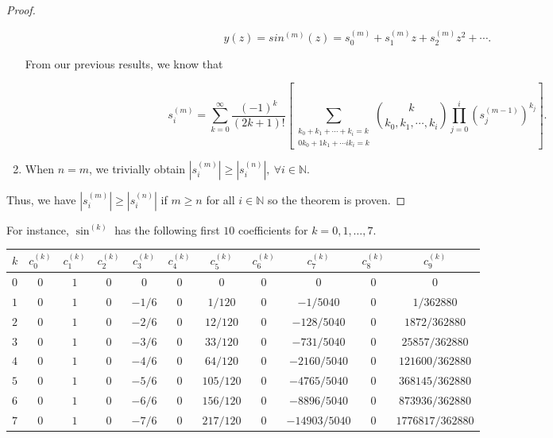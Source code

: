 \documentclass{article}
\begin{document}
\begin{proof}
\begin{enumerate}
            \begin{equation}
                y(z) = sin^{(m)}(z) = s_0^{(m)} + s_1^{(m)} z + s_2^{(m)} z^2 + \cdots.
            \end{equation}

            From our previous results, we know that

            \begin{equation}
                s_i^{(m)} = \sum_{k=0}^{\infty} \frac{(-1)^k}{(2k+1)!} \left[\sum_{\substack{k_0 + k_1 + \cdots + k_i = k \\ 0k_0 + 1k_1 + \cdots ik_i = k}} \binom{k}{k_0, k_1, \cdots, k_i} \prod_{j=0}^{i} \left(s_j^{(m-1)}\right)^{k_j}\right].
            \end{equation}
            
            \item When $n = m$, we trivially obtain $\left|s_{i}^{(m)}\right| \geq \left|s_{i}^{(n)}\right|,\ \forall i \in \mathbb{N}$.
        \end{enumerate}
        
        Thus, we have $\left|s_i^{(m)}\right| \geq \left|s_i^{(n)}\right|$ if $m \geq n$ for all $i \in \mathbb{N}$ so the theorem is proven.
    \end{proof}

    For instance, $\sin^{(k)}$ has the following first $10$ coefficients for $k = 0, 1, \ldots, 7$.

    \begin{table}[h]
    \centering
    \begin{tabular}{@{}l|cccccccccc@{}}
    $k$ & $c_{0}^{(k)}$ & $c_{1}^{(k)}$ & $c_{2}^{(k)}$ & $c_{3}^{(k)}$ & $c_{4}^{(k)}$ & $c_{5}^{(k)}$ & $c_{6}^{(k)}$ & $c_{7}^{(k)}$ & $c_{8}^{(k)}$ & $c_{9}^{(k)}$ \\ \midrule
    $0$ & $0$ & $1$ & $0$ & $0$    & $0$ & $0$       & $0$ & $0$           & $0$ & $0$              \\
    $1$ & $0$ & $1$ & $0$ & $-1/6$ & $0$ & $1/120$   & $0$ & $-1/5040$     & $0$ & $1/362880$       \\
    $2$ & $0$ & $1$ & $0$ & $-2/6$ & $0$ & $12/120$  & $0$ & $-128/5040$   & $0$ & $1872/362880$    \\
    $3$ & $0$ & $1$ & $0$ & $-3/6$ & $0$ & $33/120$  & $0$ & $-731/5040$   & $0$ & $25857/362880$   \\
    $4$ & $0$ & $1$ & $0$ & $-4/6$ & $0$ & $64/120$  & $0$ & $-2160/5040$  & $0$ & $121600/362880$  \\
    $5$ & $0$ & $1$ & $0$ & $-5/6$ & $0$ & $105/120$ & $0$ & $-4765/5040$  & $0$ & $368145/362880$  \\
    $6$ & $0$ & $1$ & $0$ & $-6/6$ & $0$ & $156/120$ & $0$ & $-8896/5040$  & $0$ & $873936/362880$  \\
    $7$ & $0$ & $1$ & $0$ & $-7/6$ & $0$ & $217/120$ & $0$ & $-14903/5040$ & $0$ & $1776817/362880$ \\
    \end{tabular}
    \end{table}
\end{document}
